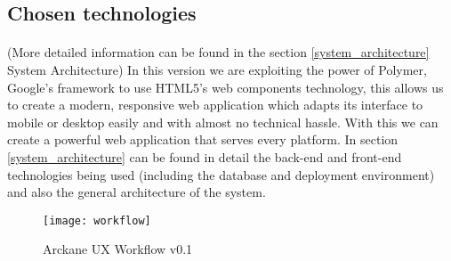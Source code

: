 \subsection{Chosen technologies}
\paragraph{} (More detailed information can be found in the section \ref{system_architecture} System Architecture) In this version we are exploiting the power of Polymer, Google’s framework to use HTML5’s web components technology, this allows us to create a modern, responsive web application which adapts its interface to mobile or desktop easily and with almost no technical hassle. With this we can create a powerful web application that serves every platform. In section  \ref{system_architecture} can be found in detail the back-end and front-end technologies being used (including the database and deployment environment) and also the general architecture of the system.

\pagebreak %
\begin{figure}[h] %
    \centering
    \texttt{[image: workflow]}
    \caption{Arckane UX Workflow v0.1}
    \label{fig:workflow}
\end{figure}
\restoregeometry %
\pagebreak



